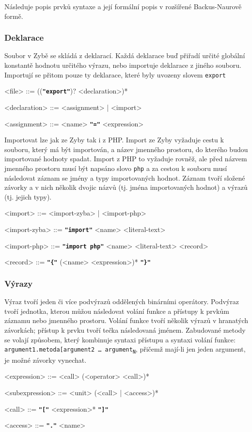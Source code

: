\documentclass[a4paper,12pt]{article}
\def\quote #1{"#1"}
\def\emphasis #1{\textbf{\texttt{\quote{#1}}}}
\begin{document}
Následuje popis prvků syntaxe a její formální popis v rozšířené Backus-Naurově formě.

\subsubsection{Deklarace}
Soubor v Zybě se skládá z deklarací. Každá deklarace buď přiřadí určité globální konstantě hodnotu určitého výrazu, nebo importuje deklarace z jiného souboru. Importují se přitom pouze ty deklarace, které byly uvozeny slovem \texttt{export}
\begin{grammar}
<file> ::= ((\emphasis{export})? <declaration>)*

<declaration> ::= <assignment> | <import>

<assignment> ::= <name> \emphasis{=} <expression>
\end{grammar}

Importovat lze jak ze Zyby tak i z PHP. Import ze Zyby vyžaduje cestu k souboru, který má být importován, a název jmenného prostoru, do kterého budou importované hodnoty spadat. Import z PHP to vyžaduje rovněž, ale před názvem jmenného prostoru musí být napsáno slovo \texttt{php} a za cestou k souboru musí následovat záznam se jmény a typy importovaných hodnot. Záznam tvoří složené závorky a v nich několik dvojic názvů (tj. jména importovaných hodnot) a výrazů (tj. jejich typy).
\begin{grammar}
<import> ::= <import-zyba> | <import-php>

<import-zyba> ::= \emphasis{import} <name> <literal-text>

<import-php> ::= \emphasis{import php} <name> <literal-text> <record>

<record> ::= \emphasis{\{} (<name> <expression>)* \emphasis{\}}
\end{grammar}

\subsubsection{Výrazy}
Výraz tvoří jeden či více podvýrazů oddělených binárními operátory. Podvýraz tvoří jednotka, kterou můžou následovat volání funkce a přístupy k prvkům záznamu nebo jmenného prostoru. Volání funkce tvoří několik výrazů v hranatých závorkách; přístup k prvku tvoří tečka následovaná jménem. Zabudované metody se volají způsobem, který kombinuje syntaxi přístupu a syntaxi volání funkce: \texttt{argument1.metoda[argument2 \ldots{} argument\textsubscript{N}}, přičemž mají-li jen jeden argument, je možné závorky vynechat.
\begin{grammar}
<expression> ::= <call> (<operator> <call>)*

<subexpression> ::= <unit> (<call> | <access>)*

<call> ::= \emphasis{[} <expression>* \emphasis{]}

<access> ::= \emphasis{.} <name>
\end{grammar}
\end{document}
